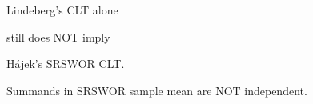 %
%
%
%
%
%

\begin{frame}{\LARGE}

{\Huge
\begin{center}
Lindeberg's CLT alone

\vskip 0.2cm
still does NOT imply

\vskip 0.2cm
H\'{a}jek's SRSWOR CLT.

\vskip 0.2cm
{\normalsize\color{red}Summands in SRSWOR sample mean are NOT independent.}
\end{center}
}

\end{frame}
\normalsize

